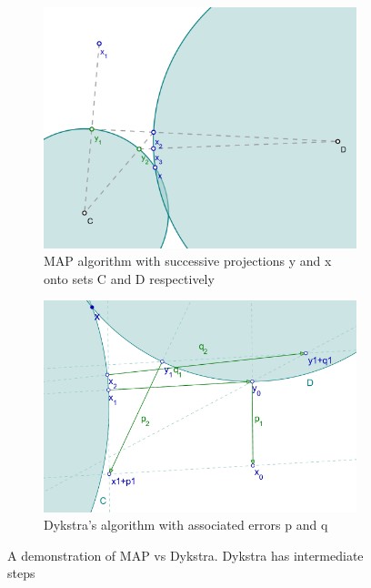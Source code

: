 \documentclass[hidelinks]{article}
\begin{document}
\begin{figure}[h]
    \centering
    
    \begin{subfigure}[t]{0.49\textwidth}
        \centering
        \includegraphics[width=1\textwidth]{Latex/Current Version/Figures/MAP_wiki.png}
        \caption{MAP algorithm with successive projections y and x onto sets C and D respectively}
        \label{fig:wikiMAP}
    \end{subfigure}
    \hfill
    \begin{subfigure}[t]{0.49\textwidth}
        \centering
        \includegraphics[width=1\textwidth]{Latex/Current Version/Figures/Dykstra_wiki.png}
        \caption{Dykstra's algorithm with associated errors p and q}
        \label{fig:wikiDykstra}
    \end{subfigure}
    \caption{A demonstration of MAP vs Dykstra. Dykstra has intermediate steps}
    \label{fig:wiki}
\end{figure}
\end{document}
